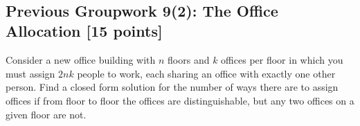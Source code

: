 \documentclass[12pt]{exam}
\begin{document}
\begin{solution}
    ~\\~\\~\\~\\~\\~\\~\\~\\~\\~\\~\\~\\~\\~\\~\\~\\~\\~\\~\\~\\~\\~\\~\\~\\~\\~\\~\\~\\
\end{solution}

\subsection*{Previous Groupwork 9(2): The Office Allocation [15 points]}
Consider a new office building with $n$ floors and $k$ offices per floor in which you must assign $2nk$ people to work, each sharing an office with exactly one other person. Find a closed form solution for the number of ways there are to assign offices if from floor to floor the offices are distinguishable, but any two offices on a given floor are not.

\begin{solution}
    ~\\~\\~\\~\\~\\~\\~\\~\\~\\~\\~\\~\\~\\~\\~\\~\\~\\~\\~\\~\\~\\~\\~\\~\\~\\~\\~\\~\\
\end{solution}
\end{document}
